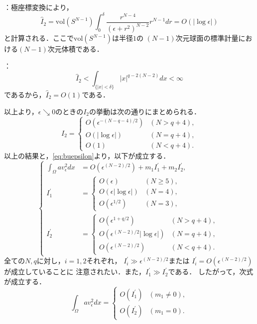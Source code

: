 ：極座標変換により，
\[
 \hat{I}_2 = \mathrm{vol}(S^{N-1}) \int_0^{\delta} \frac{
 r^{N-4}}{(\epsilon + r^2)^{N-2}} r^{N-1} dr =
 O(\lvert \log \epsilon \rvert)
\]
と計算される．ここで$ \mathrm{vol}(S^{N-1})$は半径$1$の
$(N-1)$次元球面の標準計量における$(N-1)$次元体積である．

：
\[
 \hat{I}_2 < \int_{ \{ \lvert x \rvert < \delta \}} \lvert x \rvert^{q -
 2(N-2)} dx < \infty
\]
であるから，$\hat{I}_2 = O(1)$である．

以上より，$\epsilon \searrow 0$のときの$I_2$の挙動は次の通りにまとめられる．
\[
 I_2 = \begin{cases}
        O(\epsilon^{-(N-q-4)/2}) & (N > q + 4),\\
        O(\lvert \log \epsilon \rvert) & (N = q + 4), \\ 
        O(1) & (N < q + 4).
       \end{cases}
\]
以上の結果と，\eqref{eq:buepsilon}より，以下が成立する．
\begin{equation}
 \left\{ 
 \begin{aligned}
  \int_\Omega a v_\epsilon^2 dx &= O(\epsilon^{(N-2)/2})
  + m_1 I_1^\prime + m_2
  I_2^\prime, \\
  I_1^\prime &= \begin{cases}
                 O(\epsilon) & (N \geq 5), \\
                 O(\epsilon \lvert \log \epsilon \rvert) & (N = 4), \\
                 O(\epsilon^{1/2}) & (N = 3),
                \end{cases} \\
  I_2^\prime &= \begin{cases}
                 O(\epsilon^{1 + q/2 }) & (N > q + 4), \\
                 O(\epsilon^{(N-2)/2} \lvert \log \epsilon \rvert) & (N =
                 q + 4), \\
                 O(\epsilon^{(N-2)/2}) & (N < q + 4).
                \end{cases}
 \end{aligned} \right. \label{eq:av_epsilon}
\end{equation}
全ての$N, q$に対し，$i = 1, 2$それぞれ，
$I^{\prime}_i \gg \epsilon^{(N-2)/2}$または
$I^{\prime}_i = O(\epsilon^{(N-2)/2})$が成立していることに
注意されたい．また，$I^\prime_1 \gg I^\prime_2$である．
したがって，次式が成立する．
\[
 \int_\Omega av_\epsilon^2 dx = \begin{cases}
                                 O(I_1^\prime) & (m_1 \neq 0), \\ 
                                 O(I_2^\prime) & (m_1 = 0).
                                \end{cases}
\]

